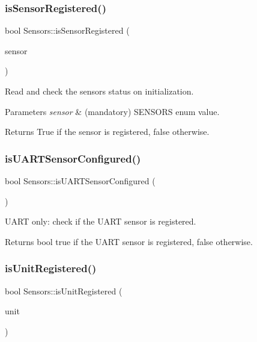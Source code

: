 \subsubsection{\texorpdfstring{is\+Sensor\+Registered()}{isSensorRegistered()}}
{\footnotesize\ttfamily bool Sensors\+::is\+Sensor\+Registered (\begin{DoxyParamCaption}\item[{S\+E\+N\+S\+O\+RS}]{sensor }\end{DoxyParamCaption})}



Read and check the sensors status on initialization. 


\begin{DoxyParams}{Parameters}
{\em sensor} & (mandatory) S\+E\+N\+S\+O\+RS enum value. \\
\hline
\end{DoxyParams}
\begin{DoxyReturn}{Returns}
True if the sensor is registered, false otherwise. 
\end{DoxyReturn}
\mbox{\label{classSensors_aa99811f9bb9778253e4d0476fab7b86c}} 
\subsubsection{\texorpdfstring{is\+U\+A\+R\+T\+Sensor\+Configured()}{isUARTSensorConfigured()}}
{\footnotesize\ttfamily bool Sensors\+::is\+U\+A\+R\+T\+Sensor\+Configured (\begin{DoxyParamCaption}{ }\end{DoxyParamCaption})}



U\+A\+RT only\+: check if the U\+A\+RT sensor is registered. 

\begin{DoxyReturn}{Returns}
bool true if the U\+A\+RT sensor is registered, false otherwise. 
\end{DoxyReturn}
\mbox{\label{classSensors_ac1acd7bf32bda39fdfde1753af3ceef2}} 
\subsubsection{\texorpdfstring{is\+Unit\+Registered()}{isUnitRegistered()}}
{\footnotesize\ttfamily bool Sensors\+::is\+Unit\+Registered (\begin{DoxyParamCaption}\item[{U\+N\+IT}]{unit }\end{DoxyParamCaption})}



